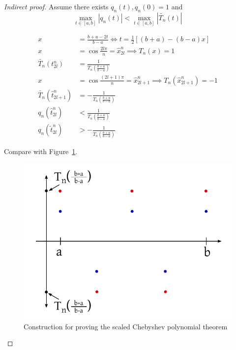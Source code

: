\documentclass{article}
\newcommand{\card}[1]{\left|#1\right|}
\begin{document}
\begin{proof}[Indirect proof]
  Assume there exists $q_n(t), q_n(0) = 1$ and
  \[ \max_{t \in [a,b]} \card{q_n(t)} < \max_{t \in [a,b]} \card{\tilde{T_n}(t)} \]

  \begin{align*}
    x &= \frac{b + a - 2t}{b - a} \iff t = \frac12 \left[ (b + a) - (b - a) x \right] \\
    x &= \cos{\frac{2l\pi}{n}} = \hat{x}_{2l}^n \implies T_n(x) = 1 \\
    \tilde{T_n}(t_{2l}^n) &= \frac{1}{T_n\left(\frac{b + a}{b - a}\right)} \\
    x &= \cos{\frac{(2l + 1) \pi}{n}} = \hat{x}_{2l+1}^n \implies T_n(\hat{x}_{2l+1}^n) = -1 \\
    \tilde{T_n}(\hat{t}_{2l+1}^n) &= -\frac{1}{T_n\left(\frac{b + a}{b - a}\right)} \\
    q_n\left(\hat{t}_{2l}^n\right) &< \frac{1}{T_n\left(\frac{b + a}{b - a}\right)} \\
    q_n(\tilde{t}_{2l}^n) &> -\frac{1}{T_n\left(\frac{b + a}{b - a}\right)}
  \end{align*}

  Compare with Figure~\ref{img:scpt}.

  \begin{figure}[t]
    \begin{center}
      \includegraphics{img/03b_scaled_chebyshev_polynomials_theorem.pdf}
      \caption{Construction for proving the scaled Chebyshev polynomial theorem}
      \label{img:scpt}
    \end{center}
  \end{figure}


\end{proof}
\end{document}
